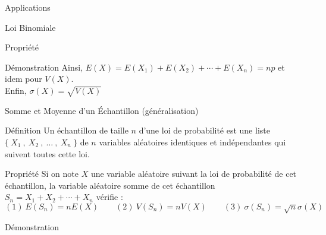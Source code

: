 \documentclass{coursbook}
\begin{document}
\begin{Gpartie}{Applications}
\begin{Spartie}{Loi Binomiale}
\begin{SSpartie}{Propriété}
\begin{SSSpartie}{Démonstration}
                    Ainsi, $E(X)=E\left(X_1\right)+E\left(X_2\right)+\dotsb+E\left(X_n\right)=np$ et idem pour $V(X)$. \\
                    Enfin, $\sigma(X)=\sqrt{V(X)}$
                \end{SSSpartie}
            \end{SSpartie}
        \end{Spartie}
        \begin{Spartie}{Somme et Moyenne d'un Échantillon (généralisation)} 
            \begin{SSpartie}{Définition} 
                Un échantillon de taille $n$ d'une loi de probabilité est une liste $\big\{~X_1~,~X_2~,~\dotsc~,~X_n~\big\}$ de $n$ variables aléatoires identiques et indépendantes qui suivent toutes cette loi.
            \end{SSpartie}
            \begin{SSpartie}{Propriété} 
                Si on note $X$ une variable aléatoire suivant la loi de probabilité de cet échantillon, la variable aléatoire \og somme \fg{} de cet échantillon $S_n=X_1+X_2+\dotsb+X_n$ vérifie : \vfill \[(1)~E\left(S_n\right)=nE(X)\qquad(2)~V\left(S_n\right)=nV(X)\qquad(3)~\sigma\left(S_n\right)=\sqrt{n}\sigma(X)\] \vfill
                \begin{SSSpartie}{Démonstration}
\end{SSSpartie}
\end{SSpartie}
\end{Spartie}
\end{Gpartie}
\end{document}
